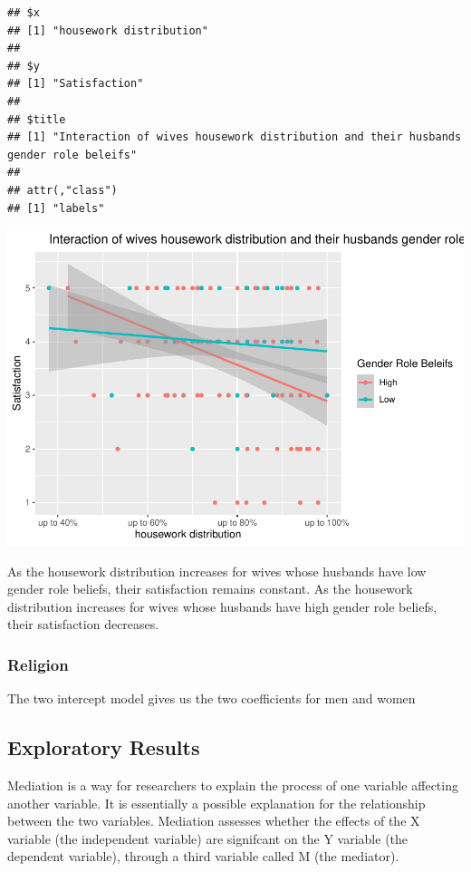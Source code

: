 \documentclass[
  man,floatsintext]{apa6}
\begin{document}
\begin{verbatim}
## $x
## [1] "housework distribution"
## 
## $y
## [1] "Satisfaction"
## 
## $title
## [1] "Interaction of wives housework distribution and their husbands gender role beleifs"
## 
## attr(,"class")
## [1] "labels"
\end{verbatim}

\includegraphics{results_files/figure-latex/unnamed-chunk-10-1.pdf}

As the housework distribution increases for wives whose husbands have low gender role beliefs, their satisfaction remains constant. As the housework distribution increases for wives whose husbands have high gender role beliefs, their satisfaction decreases.

\hypertarget{religion}{%
\subsubsection{Religion}\label{religion}}

The two intercept model gives us the two coefficients for men and women

\hypertarget{exploratory-results}{%
\subsection{Exploratory Results}\label{exploratory-results}}

Mediation is a way for researchers to explain the process of one variable affecting another variable. It is essentially a possible explanation for the relationship between the two variables. Mediation assesses whether the effects of the X variable (the independent variable) are signifcant on the Y variable (the dependent variable), through a third variable called M (the mediator).
\end{document}
